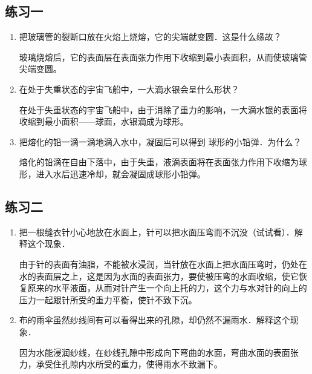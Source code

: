 \subsection{练习一}
\begin{enumerate}
    \item 把玻璃管的裂断口放在火焰上烧熔，它的尖端就变圆．这是什么缘故？

\begin{solution}
    玻璃烧熔后，它的表面层在表面张力作用下收缩到最小表面积，从而使玻璃管尖端变圆。    
\end{solution}
\item 在处于失重状态的宇宙飞船中，一大滴水银会呈什么形状？

\begin{solution}
    在处于失重状态的宇宙飞船中，由于消除了重力的影响，一大滴水银的表面将收缩到最小面积——球面，水银滴成为球形。    
\end{solution}
\item 把熔化的铅一滴一滴地滴入水中，凝固后可以得到
球形的小铅弹．为什么？

\begin{solution}
    熔化的铅滴在自由下落中，由于失重，液滴表面将在表面张力作用下收缩为球形，进入水后迅速冷却，就会凝固成球形小铅弹。
\end{solution}
\end{enumerate}

\subsection{练习二}

\begin{enumerate}
   \item 把一根缝衣针小心地放在水面上，针可以把水面压弯而不沉没（试试看）．解释这个现象．

   \begin{solution}
 由于针的表面有油脂，不能被水浸润，当针放在水面上把水面压弯时，仍处在水的表面层之上，这是因为水面的表面张力，要使被压弯的水面收缩，使它恢复原来的水平液面，从而对针产生一个向上托的力，这个力与水对针的向上的压力一起跟针所受的重力平衡，使针不致下沉。  
   \end{solution}
   \item 布的雨伞虽然纱线间有可以看得出来的孔隙，却仍然不漏雨水．解释这个现象．

   \begin{solution}
    因为水能浸润纱线，在纱线孔隙中形成向下弯曲的水面，弯曲水面的表面张力，承受住孔隙内水所受的重力，使得雨水不致漏下。
   \end{solution}
\end{enumerate}




